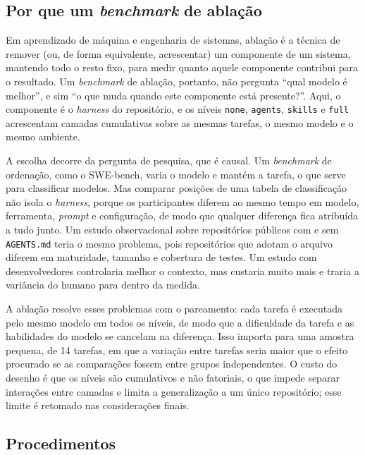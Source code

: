 \subsection{Por que um \textit{benchmark} de ablação}
\label{sec:porque-ablacao}

Em aprendizado de máquina e engenharia de sistemas, ablação é a técnica de
remover (ou, de forma equivalente, acrescentar) um componente de um sistema,
mantendo todo o resto fixo, para medir quanto aquele componente contribui para o
resultado. Um \textit{benchmark} de ablação, portanto, não pergunta ``qual modelo
é melhor'', e sim ``o que muda quando este componente está presente?''. Aqui, o
componente é o \textit{harness} do repositório, e os níveis \texttt{none},
\texttt{agents}, \texttt{skills} e \texttt{full} acrescentam camadas
cumulativas sobre as mesmas tarefas, o mesmo modelo e o mesmo ambiente.

A escolha decorre da pergunta de pesquisa, que é causal. Um \textit{benchmark} de
ordenação, como o SWE-bench, varia o modelo e mantém a tarefa, o que serve para
classificar modelos. Mas comparar posições de uma tabela de classificação não
isola o \textit{harness}, porque os participantes diferem ao mesmo tempo em
modelo, ferramenta, \textit{prompt} e configuração, de modo que qualquer
diferença fica atribuída a tudo junto. Um estudo observacional sobre repositórios
públicos com e sem \texttt{AGENTS.md} teria o mesmo problema, pois repositórios
que adotam o arquivo diferem em maturidade, tamanho e cobertura de testes. Um
estudo com desenvolvedores controlaria melhor o contexto, mas custaria muito mais
e traria a variância do humano para dentro da medida.

A ablação resolve esses problemas com o pareamento: cada tarefa é executada pelo
mesmo modelo em todos os níveis, de modo que a dificuldade da tarefa e as
habilidades do modelo se cancelam na diferença. Isso importa para uma amostra
pequena, de 14 tarefas, em que a variação entre tarefas seria maior que o efeito
procurado se as comparações fossem entre grupos independentes. O custo do
desenho é que os níveis são cumulativos e não fatoriais, o que impede separar
interações entre camadas e limita a generalização a um único repositório; esse
limite é retomado nas considerações finais.

\subsection{Procedimentos}
\label{sec:procedimentos}

